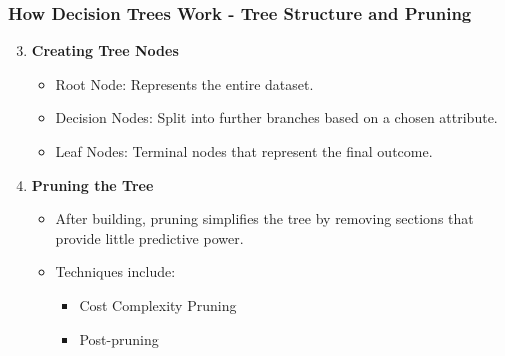 \documentclass[aspectratio=169]{beamer}
\begin{document}
\begin{frame}[fragile]
    \frametitle{How Decision Trees Work - Tree Structure and Pruning}
    \begin{enumerate}
        \setcounter{enumi}{2}
        \item \textbf{Creating Tree Nodes}
        \begin{itemize}
            \item Root Node: Represents the entire dataset.
            \item Decision Nodes: Split into further branches based on a chosen attribute.
            \item Leaf Nodes: Terminal nodes that represent the final outcome.
        \end{itemize}

        \item \textbf{Pruning the Tree}
        \begin{itemize}
            \item After building, pruning simplifies the tree by removing sections that provide little predictive power.
            \item Techniques include:
            \begin{itemize}
                \item Cost Complexity Pruning
                \item Post-pruning
            \end{itemize}
        \end{itemize}
    \end{enumerate}
\end{frame}
\end{document}
